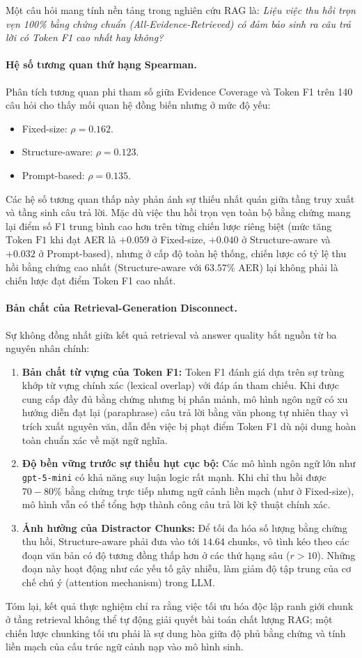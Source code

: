 Một câu hỏi mang tính nền tảng trong nghiên cứu RAG là: \textit{Liệu việc thu hồi trọn vẹn 100\% bằng chứng chuẩn (All-Evidence-Retrieved) có đảm bảo sinh ra câu trả lời có Token F1 cao nhất hay không?}

\paragraph{Hệ số tương quan thứ hạng Spearman.}
Phân tích tương quan phi tham số giữa Evidence Coverage và Token F1 trên 140 câu hỏi cho thấy mối quan hệ đồng biến nhưng ở mức độ yếu:
\begin{itemize}
    \item Fixed-size: $\rho = 0.162$.
    \item Structure-aware: $\rho = 0.123$.
    \item Prompt-based: $\rho = 0.135$.
\end{itemize}
Các hệ số tương quan thấp này phản ánh sự thiếu nhất quán giữa tầng truy xuất và tầng sinh câu trả lời. Mặc dù việc thu hồi trọn vẹn toàn bộ bằng chứng mang lại điểm số F1 trung bình cao hơn trên từng chiến lược riêng biệt (mức tăng $\text{Token F1}$ khi đạt AER là $+0.059$ ở Fixed-size, $+0.040$ ở Structure-aware và $+0.032$ ở Prompt-based), nhưng ở cấp độ toàn hệ thống, chiến lược có tỷ lệ thu hồi bằng chứng cao nhất (Structure-aware với $63.57\%$ AER) lại không phải là chiến lược đạt điểm Token F1 cao nhất.

\paragraph{Bản chất của Retrieval-Generation Disconnect.}
Sự không đồng nhất giữa kết quả retrieval và answer quality bắt nguồn từ ba nguyên nhân chính:
\begin{enumerate}
    \item \textbf{Bản chất từ vựng của Token F1:} Token F1 đánh giá dựa trên sự trùng khớp từ vựng chính xác (lexical overlap) với đáp án tham chiếu. Khi được cung cấp đầy đủ bằng chứng nhưng bị phân mảnh, mô hình ngôn ngữ có xu hướng diễn đạt lại (paraphrase) câu trả lời bằng văn phong tự nhiên thay vì trích xuất nguyên văn, dẫn đến việc bị phạt điểm Token F1 dù nội dung hoàn toàn chuẩn xác về mặt ngữ nghĩa.
    \item \textbf{Độ bền vững trước sự thiếu hụt cục bộ:} Các mô hình ngôn ngữ lớn như \texttt{gpt-5-mini} có khả năng suy luận logic rất mạnh. Khi chỉ thu hồi được $70-80\%$ bằng chứng trực tiếp nhưng ngữ cảnh liền mạch (như ở Fixed-size), mô hình vẫn có thể tổng hợp thành công câu trả lời kỹ thuật chính xác.
    \item \textbf{Ảnh hưởng của Distractor Chunks:} Để tối đa hóa số lượng bằng chứng thu hồi, Structure-aware phải đưa vào tới $14.64$ chunks, vô tình kéo theo các đoạn văn bản có độ tương đồng thấp hơn ở các thứ hạng sâu ($r > 10$). Những đoạn này hoạt động như các yếu tố gây nhiễu, làm giảm độ tập trung của cơ chế chú ý (attention mechanism) trong LLM.
\end{enumerate}

Tóm lại, kết quả thực nghiệm chỉ ra rằng việc tối ưu hóa độc lập ranh giới chunk ở tầng retrieval không thể tự động giải quyết bài toán chất lượng RAG; một chiến lược chunking tối ưu phải là sự dung hòa giữa độ phủ bằng chứng và tính liền mạch của cấu trúc ngữ cảnh nạp vào mô hình sinh.


